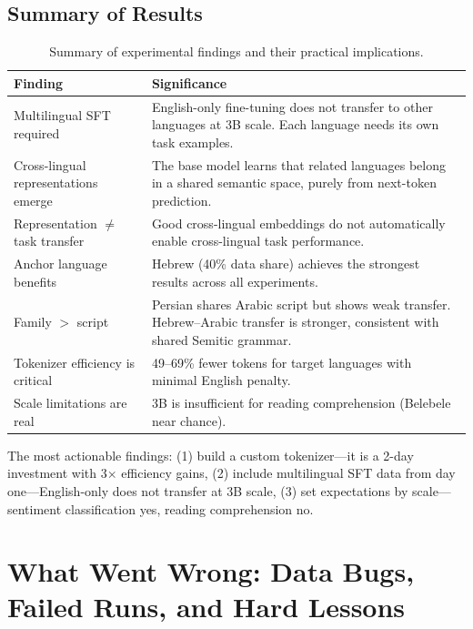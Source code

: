 \documentclass[11pt,a4paper]{article}
\begin{document}
\subsection{Summary of Results}

\begin{table}[H]
\centering
\begin{tabular}{lp{10cm}}
\toprule
\textbf{Finding} & \textbf{Significance} \\
\midrule
Multilingual SFT required & English-only fine-tuning does not transfer to other languages at 3B scale. Each language needs its own task examples. \\
Cross-lingual representations emerge & The base model learns that related languages belong in a shared semantic space, purely from next-token prediction. \\
Representation $\neq$ task transfer & Good cross-lingual embeddings do not automatically enable cross-lingual task performance. \\
Anchor language benefits & Hebrew (40\% data share) achieves the strongest results across all experiments. \\
Family $>$ script & Persian shares Arabic script but shows weak transfer. Hebrew--Arabic transfer is stronger, consistent with shared Semitic grammar. \\
Tokenizer efficiency is critical & 49--69\% fewer tokens for target languages with minimal English penalty. \\
Scale limitations are real & 3B is insufficient for reading comprehension (Belebele near chance). \\
\bottomrule
\end{tabular}
\caption{Summary of experimental findings and their practical implications.}
\end{table}

\begin{tip}[title={Builder Takeaway}]
The most actionable findings: (1) build a custom tokenizer---it is a 2-day investment with 3$\times$ efficiency gains, (2) include multilingual SFT data from day one---English-only does not transfer at 3B scale, (3) set expectations by scale---sentiment classification yes, reading comprehension no.
\end{tip}



\section{What Went Wrong: Data Bugs, Failed Runs, and Hard Lessons}
\label{ch:lessons}
\end{document}
